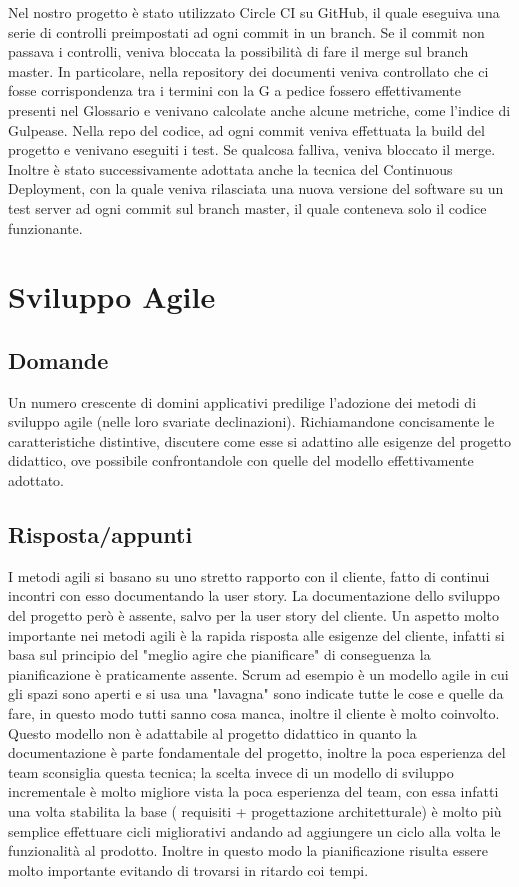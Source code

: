 Nel nostro progetto è stato utilizzato Circle CI su GitHub, il quale eseguiva una serie di controlli preimpostati ad ogni commit in un branch. Se il commit non passava i controlli, veniva bloccata la possibilità di fare il merge sul branch master. In particolare, nella repository dei documenti veniva controllato che ci fosse corrispondenza tra i termini con la G a pedice fossero effettivamente presenti nel Glossario e venivano calcolate anche alcune metriche, come l'indice di Gulpease.
Nella repo del codice, ad ogni commit veniva effettuata la build del progetto e venivano eseguiti i test. Se qualcosa falliva, veniva bloccato il merge.
Inoltre è stato successivamente adottata anche la tecnica del Continuous Deployment, con la quale veniva rilasciata una nuova versione del software su un test server ad ogni commit sul branch master, il quale conteneva solo il codice funzionante.

\section{Sviluppo Agile}

\subsection*{Domande}
Un numero crescente di domini applicativi predilige l'adozione dei metodi di sviluppo agile (nelle loro svariate declinazioni). Richiamandone concisamente le caratteristiche distintive, discutere come esse si adattino alle esigenze del progetto didattico, ove possibile confrontandole con quelle del modello effettivamente adottato.

\subsection*{Risposta/appunti}
I metodi agili si basano su uno stretto rapporto con il cliente, fatto di continui incontri con esso documentando la user
story. La documentazione dello sviluppo del progetto però è assente, salvo per la user story del cliente.
Un aspetto molto importante nei metodi agili è la rapida risposta alle esigenze del cliente, infatti si basa sul principio del
"meglio agire che pianificare" di conseguenza la pianificazione è praticamente assente. Scrum ad esempio è un modello
agile in cui gli spazi sono aperti e si usa una "lavagna" sono indicate tutte le cose e quelle da fare, in questo modo tutti
sanno cosa manca, inoltre il cliente è molto coinvolto.
Questo modello non è adattabile al progetto didattico in quanto la documentazione è parte fondamentale del progetto,
inoltre la poca esperienza del team sconsiglia questa tecnica; la scelta invece di un modello di sviluppo incrementale è
molto migliore vista la poca esperienza del team, con essa infatti una volta stabilita la base ( requisiti + progettazione
architetturale) è molto più semplice effettuare cicli migliorativi andando ad aggiungere un ciclo alla volta le funzionalità
al prodotto. Inoltre in questo modo la pianificazione risulta essere molto importante evitando di trovarsi in ritardo coi
tempi.

